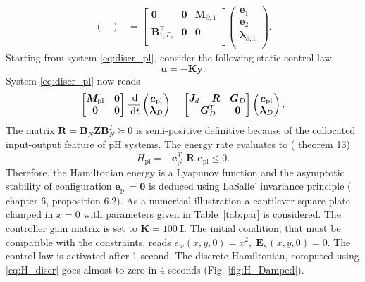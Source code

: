 \begin{equation}
\begin{aligned}
\begin{pmatrix}
\end{pmatrix}
&= \begin{bmatrix}
\mathbf{0} & \mathbf{0} & \mathbf{M}_{\partial, 1} \\
\mathbf{B}_{1, \Gamma_2}^\top & \mathbf{0} & \mathbf{0} \\
\end{bmatrix}\begin{pmatrix}
\mathbf{e}_{1} \\
\mathbf{e}_{2} \\
{\bm{\lambda}}_{\partial, 1} \\
\end{pmatrix}.
\end{aligned}
\end{equation}
 Starting from system \eqref{eq:discr_pl}, consider the following static control law
\begin{equation}
\bm{u} = -\bm{K} \bm{y}.
\end{equation}
System \eqref{eq:discr_pl} now reads
\begin{equation}
\begin{bmatrix}
\bm{M}_{\text{pl}} & \bm{0} \\
\bm{0} & \bm{0} \\
\end{bmatrix}\frac{\d}{\d t}
\begin{pmatrix}
\bm{e}_{\text{pl}}\\
\bm{\lambda}_D \\
\end{pmatrix}
= \begin{bmatrix}
\bm{J}_d - \bm{R} & \bm{G}_D \\
-\bm{G}_D^T & \bm{0} \\
\end{bmatrix}
\begin{pmatrix}
\bm{e}_{\text{pl}}\\
\bm{\lambda}_D \\
\end{pmatrix}.
\end{equation}
The matrix $\bm{R} = \bm{B}_N \bm{Z} \bm{B}_N^T \succcurlyeq 0$ is semi-positive definitive because of the collocated input-output feature of pH systems. The energy rate evaluates to (\cite{beattie2018linear} theorem 13)
\[\dot{H} _{\text{pl}} = - \bm{e}_{\text{pl}}^T \; \bm{R} \; \bm{e}_{\text{pl}} \le 0. \]
Therefore, the Hamiltonian energy is a Lyapunov function and the asymptotic stability of configuration $\bm{e}_{\text{pl}} = \bm{0}$ is deduced using LaSalle' invariance  principle (\cite{bookPHs}  chapter 6, proposition 6.2). As a numerical illustration a cantilever square plate clamped in $x=0$ with parameters given in Table~\ref{tab:par} is considered. The controller gain matrix is set to $\bm{K} = 100 \ \bm{I}$. The initial condition, that must be compatible with the constraints, reads $e_w(x,y,0) = x^2, \; \bm{E}_{\kappa}(x,y,0)=0$. The control law is activated after 1 second. The discrete Hamiltonian, computed using \eqref{eq:H_discr} goes almost to zero in 4 seconds (Fig. \ref{fig:H_Damped}). 

